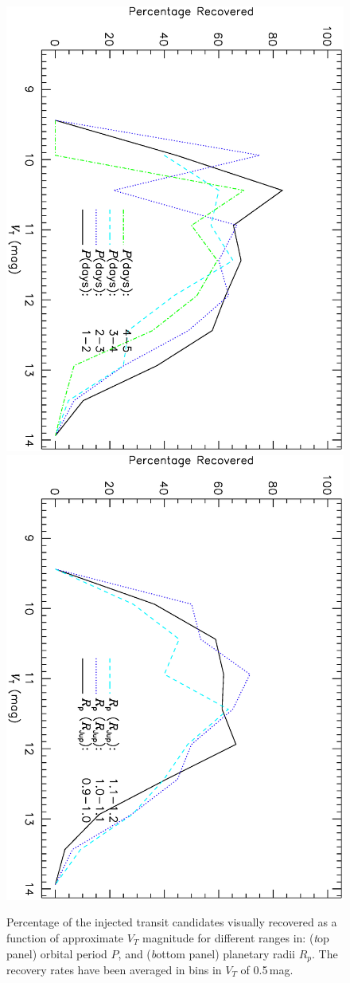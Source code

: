 \begin{figure}
\begin{center}
\centering
\includegraphics[width=.55\textwidth, angle=90]{7_visual_d}\\
\includegraphics[width=.55\textwidth, angle=90]{7_visual_e}\\
\caption[Visual-recovery rates for different periods and planetary radii]{%
Percentage of the injected transit candidates visually recovered as a function of approximate $V_{T}$ magnitude for different ranges in: %
({\textit top panel}) orbital period $P$, and %
({\textit bottom panel}) planetary radii $R_{p}$. %
The recovery rates have been averaged in bins in $V_{T}$ of 0.5\,mag.%
}\label{cha:human:sec:model:fig:visrecrates1}
\end{center}
\end{figure}

